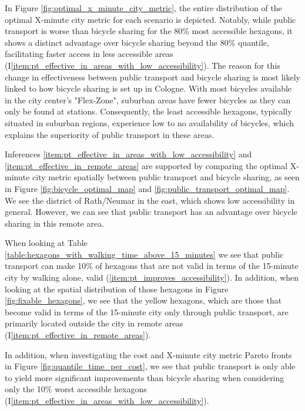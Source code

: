 In Figure \ref{fig:optimal_x_minute_city_metric}, the entire distribution of the optimal X-minute city metric for each scenario is depicted.
Notably, while public transport is worse than bicycle sharing for the 80\% most accessible hexagons, it shows a distinct advantage over bicycle sharing beyond the 80\% quantile, facilitating faster access in less accessible areas (I\ref{item:pt_effective_in_areas_with_low_accessibility}).
The reason for this change in effectiveness between public transport and bicycle sharing is most likely linked to how bicycle sharing is set up in Cologne. 
With most bicycles available in the city center's "Flex-Zone", suburban areas have fewer bicycles as they can only be found at stations.
Consequently, the least accessible hexagons, typically situated in suburban regions, experience low to no availability of bicycles, which explains the superiority of public transport in these areas. 

Inferences \ref{item:pt_effective_in_areas_with_low_accessibility} and \ref{item:pt_effective_in_remote_areas} are supported by comparing the optimal X-minute city metric spatially between public transport and bicycle sharing, as seen in Figure \ref{fig:bicycle_optimal_map} and \ref{fig:public_transport_optimal_map}.
We see the district of Rath/Neumar in the east, which shows low accessibility in general.
However, we can see that public transport has an advantage over bicycle sharing in this remote area.

When looking at Table \ref{table:hexagons_with_walking_time_above_15_minutes} we see that public transport can make 10\% of hexagons that are not valid in terms of the 15-minute city by walking alone, valid (\ref{item:pt_improves_accessibility}).
In addition, when looking at the spatial distribution of those hexagons in Figure \ref{fig:fixable_hexagons}, we see that the yellow hexagons, which are those that become valid in terms of the 15-minute city only through public transport, are primarily located outside the city in remote areas (I\ref{item:pt_effective_in_remote_areas}).

In addition, when investigating the cost and X-minute city metric Pareto fronts in Figure \ref{fig:quantile_time_per_cost}, we see that public transport is only able to yield more significant improvements than bicycle sharing when considering only the 10\% worst accessible hexagons (I\ref{item:pt_effective_in_areas_with_low_accessibility}).

